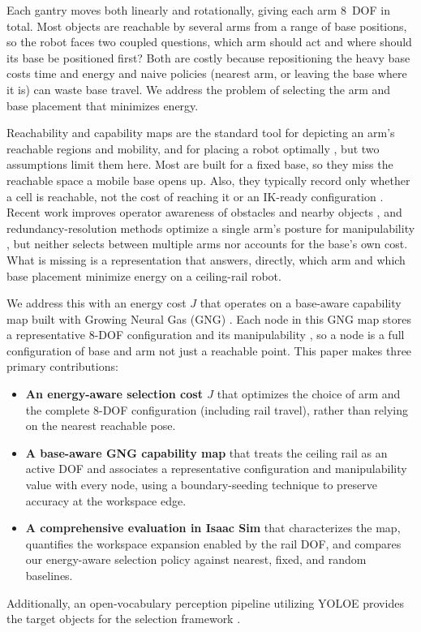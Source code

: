 \documentclass[conference]{IEEEtran}
\begin{document}
Each gantry moves both linearly and rotationally, giving each arm 8~DOF
in total. Most objects are reachable by several arms from a range of base positions,
so the robot faces two coupled questions, which arm should act and where should its
base be positioned first? Both are costly because repositioning the heavy base costs time
and energy \cite{MoMaPos2024,BaSeNet2024,EnergySLR2024} and naive policies (nearest
arm, or leaving the base where it is) can waste base travel. We address the problem
of selecting the arm and base placement that minimizes energy.

Reachability and capability maps are the standard tool for depicting an
arm's reachable regions and mobility, and for placing a robot optimally
\cite{Zacharias2007,Makhal2018}, but two assumptions limit them here. Most are built
for a fixed base, so they miss the reachable space a mobile base opens up. Also, they
typically record only whether a cell is reachable, not the cost of reaching it or an
IK-ready configuration \cite{Zacharias2007}. Recent work improves operator awareness
of obstacles and nearby objects \cite{MoMaPos2024}, and
redundancy-resolution methods optimize a single arm's posture for manipulability
\cite{Yoshikawa1985}, but neither selects between multiple arms nor accounts for the
base's own cost. What is missing is a representation that answers, directly, which
arm and which base placement minimize energy on a ceiling-rail robot.

We address this with an energy cost $J$ that operates on a base-aware
capability map built with Growing Neural Gas (GNG) \cite{Fritzke1995}. Each node in this GNG map
stores a representative 8-DOF configuration and its manipulability
\cite{Yoshikawa1985}, so a node is a full configuration of base and arm
not just a reachable point. This paper makes three primary contributions:
\begin{itemize}
    \item \textbf{An energy-aware selection cost $J$} that optimizes the choice of arm and the complete 8-DOF configuration (including rail travel), rather than relying on the nearest reachable pose.
    \item \textbf{A base-aware GNG capability map} that treats the ceiling rail as an active DOF and associates a representative configuration and manipulability value with every node, using a boundary-seeding technique to preserve accuracy at the workspace edge.
    \item \textbf{A comprehensive evaluation in Isaac Sim} that characterizes the map, quantifies the workspace expansion enabled by the rail DOF, and compares our energy-aware selection policy against nearest, fixed, and random baselines.
\end{itemize}
Additionally, an open-vocabulary perception pipeline utilizing YOLOE provides the target objects for the selection framework \cite{Wang2025}.
\end{document}
